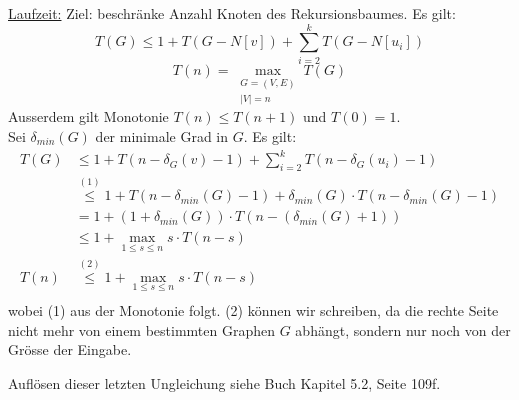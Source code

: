 \underline{Laufzeit:}
Ziel: beschränke Anzahl Knoten des Rekursionsbaumes. Es gilt:
$$ T(G) \leq 1 + T(G-N[v]) + \sum_{i=2}^k T(G-N[u_i]) $$
$$ T(n) = \max_{\substack{ G=(V,E) \\ |V|=n}} T(G) $$
%
Ausserdem gilt Monotonie $T(n) \leq T(n+1)$ und $T(0) = 1$. \\
Sei $\delta_{min}(G)$ der minimale Grad in $G$. Es gilt:
%
\begin{align*}
T(G) & \leq 1 + T(n - \delta_G(v) - 1) + \sum_{i=2}^k T(n - \delta_G(u_i) - 1) \\
     & \overset{(1)}{\leq} 1 + T(n - \delta_{min}(G) - 1) + \delta_{min}(G) \cdot T(n - \delta_{min}(G) - 1) \\
     & = 1 + (1 + \delta_{min}(G)) \cdot T(n - (\delta_{min}(G) + 1)) \\
     & \leq 1 + \max_{1 \leq s \leq n} s \cdot T(n - s) \\
T(n) & \overset{(2)}{\leq} 1 + \max_{1 \leq s \leq n} s \cdot T(n - s) \\
\end{align*}
wobei (1) aus der Monotonie folgt.
(2) können wir schreiben, da die rechte Seite nicht mehr von einem bestimmten Graphen $G$ abhängt,
sondern nur noch von der Grösse der Eingabe.

Auflösen dieser letzten Ungleichung siehe Buch Kapitel 5.2, Seite 109f.











